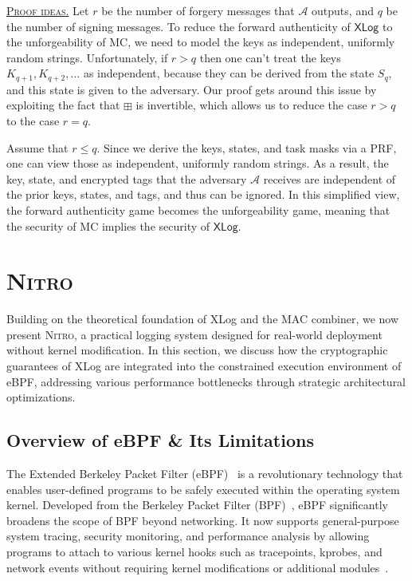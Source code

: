 \documentclass[sigconf]{sty/acmart}
\newcommand{\Sys}{\mbox{\textsc{Nitro}}\xspace}
\newcommand{\xlog}{XLog\xspace}
\newcommand{\noskipheading}[1]{\noindent\textsc{\underline{#1}}}
\newcommand{\advA}{{\mathcal A}}
\newcommand{\XLog}{\mathsf{XLog}}
\newcommand{\AMAC}{\mathrm{MC}}
\newcommand{\combine}{\boxplus}
\begin{document}
\noskipheading{Proof ideas.} Let $r$ be the number of forgery messages that $\advA$ outputs, and $q$ be the number of signing messages. 
To reduce the forward authenticity of $\XLog$ to the unforgeability of $\AMAC$, we need to model the keys as independent, uniformly random strings. 
Unfortunately, if $r > q$ then one can't treat the keys $K_{q + 1}, K_{q + 2}, \ldots$ as independent, 
because they can be derived from the state $S_q$, and this state is given to the adversary. 
Our proof gets around this issue by exploiting the fact that $\combine$ is invertible, 
which allows us to reduce the case $r > q$ to the case $r = q$. 

Assume that $r \leq q$. Since we derive the keys, states, and task masks via a PRF, 
one can view those as independent, uniformly random strings. 
As a result, the key, state, and encrypted tags that the adversary $\advA$ receives are independent of the prior keys, states, and tags, 
and thus can be ignored. 
In this simplified view, the forward authenticity game becomes the unforgeability game, 
meaning that the security of $\AMAC$ implies the security of $\XLog$.  \section{\Sys}
\label{s:design}
Building on the theoretical foundation of \xlog and the MAC combiner, we now present \Sys, a practical logging system designed for real-world deployment without kernel modification. In this section, we discuss how the cryptographic guarantees of \xlog are integrated into the constrained execution environment of eBPF, addressing various performance bottlenecks through strategic architectural optimizations.

\subsection{Overview of eBPF \& Its Limitations}


The Extended Berkeley Packet Filter (eBPF)~\cite{ebpf_overview, ebpf-faster2, ebpf-faster3} is a revolutionary technology that enables user-defined programs to be safely executed within the operating system kernel. Developed from the Berkeley Packet Filter (BPF)~\cite{linux_bpf}, eBPF significantly broadens the scope of BPF beyond networking. It now supports general-purpose system tracing, security monitoring, and performance analysis by allowing programs to attach to various kernel hooks such as tracepoints, kprobes, and network events without requiring kernel modifications or additional modules~\cite{rice2023learning}.
\end{document}
